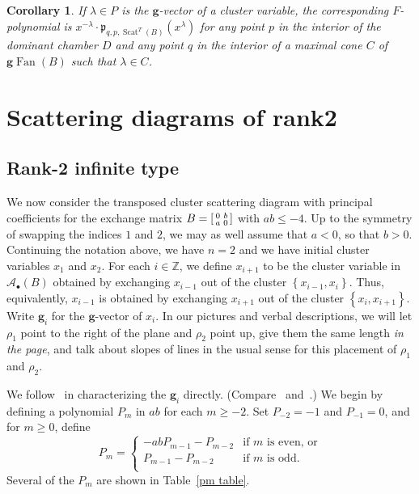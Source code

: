 \documentclass[10pt,a4paper]{amsart}
\newtheorem{coro}[theorem]{Corollary}
\theoremstyle{definition}
\DeclareMathOperator{\Scat}{Scat}
\DeclareMathOperator{\Fan}{Fan}
\newcommand{\gFan}{\g\!\Fan}
\newcommand{\integers}{\mathbb Z}
\newcommand{\set}[1]{{\left\lbrace #1 \right\rbrace}}
\newcommand{\A}{{\mathcal A}}
\newcommand{\p}{{\mathfrak p}}
\newcommand{\g}{\mathbf{g}}
\renewcommand{\a}{\mathbf{a}}
\begin{document}
\begin{coro}\label{clus mon F}
If $\lambda\in P$ is the $\g$-vector of a cluster variable, the corresponding $F$-polynomial is $x^{-\lambda}\cdot\p_{q,p,\Scat^T(B)}(x^\lambda)$ for any point $p$ in the interior of the dominant chamber $D$ and any point $q$ in the interior of a maximal cone $C$ of $\gFan(B)$ such that $\lambda\in C$.
\end{coro}

\section{Scattering diagrams of rank2}\label{rk2 sec}
\subsection{Rank-2 infinite type} \label{rk2 inf sec}
We now consider the transposed cluster scattering diagram with principal coefficients for the exchange matrix $B=\begin{bsmallmatrix}0&b\\a&0\end{bsmallmatrix}$ with $ab\le-4$.
Up to the symmetry of swapping the indices $1$ and $2$, we may as well assume that $a<0$, so that $b>0$.
Continuing the notation above, we have $n=2$ and we have initial cluster variables $x_1$ and $x_2$.
For each $i\in\integers$, we define $x_{i+1}$ to be the cluster variable in $\A_\bullet(B)$ obtained by exchanging $x_{i-1}$ out of the cluster $\set{x_{i-1},x_i}$.
Thus, equivalently, $x_{i-1}$ is obtained by exchanging $x_{i+1}$ out of the cluster $\set{x_i,x_{i+1}}$.
Write $\g_i$ for the $\g$-vector of $x_i$.
In our pictures and verbal descriptions, we will let $\rho_1$ point to the right of the plane and $\rho_2$ point up, give them the same length \emph{in the page}, and talk about slopes of lines in the usual sense for this placement of $\rho_1$ and $\rho_2$.

We follow~\cite[Section~9]{universal} in characterizing the $\g_i$ directly. (Compare~\cite[Example~1.15]{GHKK} and~\cite[Section~3]{CGMMRSW}.)
We begin by defining a polynomial $P_m$ in $ab$ for each $m\ge-2$.
Set $P_{-2}=-1$ and $P_{-1}=0$, and for $m\ge0$, define
\begin{equation}\label{Pm recur}
P_m=\begin{cases}
-abP_{m-1}-P_{m-2}&\text{if }m\text{ is even, or}\\
P_{m-1}-P_{m-2}&\text{if }m\text{ is odd.}\\
\end{cases}
\end{equation}
Several of the $P_m$ are shown in Table~\ref{pm table}.
\end{document}
